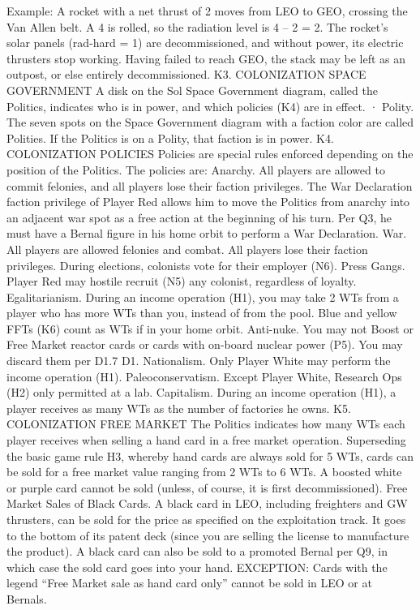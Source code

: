 \documentclass[a4paper]{book}
\begin{document}
Example: A rocket with a net thrust of 2 moves from LEO to GEO, crossing the Van Allen belt. A 4 is rolled, so the radiation level is 4 – 2 = 2. The rocket’s solar panels (rad-hard = 1) are decommissioned, and without power, its electric thrusters stop working. Having failed to reach GEO, the stack may be left as an outpost, or else entirely decommissioned.
K3. COLONIZATION SPACE GOVERNMENT
A disk on the Sol Space Government diagram, called the Politics, indicates who is in power, and which policies (K4) are in effect.  
·       Polity. The seven spots on the Space Government diagram with a faction color are called Polities. If the Politics is on a Polity, that faction is in power.
K4. COLONIZATION POLICIES
Policies are special rules enforced depending on the position of the Politics. The policies are:
Anarchy. All players are allowed to commit felonies, and all players lose their faction privileges. The War Declaration faction privilege of Player Red allows him to move the Politics from anarchy into an adjacent war spot as a free action at the beginning of his turn. Per Q3, he must have a Bernal figure in his home orbit to perform a War Declaration.
War. All players are allowed felonies and combat. All players lose their faction privileges. During elections, colonists vote for their employer (N6).
Press Gangs. Player Red may hostile recruit (N5) any colonist, regardless of loyalty.
Egalitarianism. During an income operation (H1), you may take 2 WTs from a player who has more WTs than you, instead of from the pool. Blue and yellow FFTs (K6) count as WTs if in your home orbit.
Anti-nuke. You may not Boost or Free Market reactor cards or cards with on-board nuclear power (P5). You may discard them per D1.7 D1.
Nationalism. Only Player White may perform the income operation (H1).
Paleoconservatism. Except Player White, Research Ops (H2) only permitted at a lab.
Capitalism. During an income operation (H1), a player receives as many WTs as the number of factories he owns.
K5. COLONIZATION FREE MARKET
The Politics indicates how many WTs each player receives when selling a hand card in a free market operation. Superseding the basic game rule H3, whereby hand cards are always sold for 5 WTs, cards can be sold for a free market value ranging from 2 WTs to 6 WTs. A boosted white or purple card cannot be sold (unless, of course, it is first decommissioned).
Free Market Sales of Black Cards. A black card in LEO, including freighters and GW thrusters, can be sold for the price as specified on the exploitation track. It goes to the bottom of its patent deck (since you are selling the license to manufacture the product). A black card can also be sold to a promoted Bernal per Q9, in which case the sold card goes into your hand.
EXCEPTION: Cards with the legend “Free Market sale as hand card only” cannot be sold in LEO or at Bernals.
\end{document}
